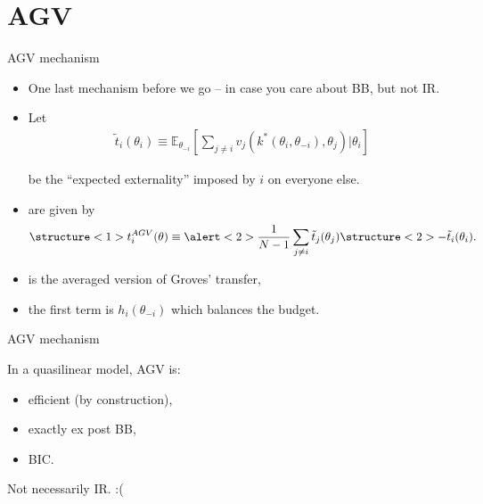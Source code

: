 \documentclass[english,10pt
,aspectratio=169
]{beamer}
\begin{document}
\section{AGV}

\begin{frame}{AGV mechanism}
\begin{itemize}
	\item One last mechanism before we go -- in case you care about BB, but not IR.
	\item Let 
	\vspace{-0.5em}\begin{align*}
		\tilde{t}_i (\theta_i) \equiv \mathbb{E}_{\theta_{-i}} \left[ \sum_{j \neq i} v_j (k^*(\theta_i,\theta_{-i}), \theta_j) | \theta_i \right]
	\end{align*}
	
	be the ``expected externality'' imposed by $i$ on everyone else.
	\item {} are given by
	\vspace{-0.5em}\begin{align*}
		\structure<1>{t_i^{AGV} (\theta) \equiv \alert<2>{\frac{1}{N-1} \sum_{j \neq i} \tilde{t}_j (\theta_j)} \structure<2>{- \tilde{t}_i (\theta_i)}}.
	\end{align*}\vspace{-1em}
	\pause
	\item {} is the averaged version of Groves' transfer,
	\item \alert{the first term} is $h_i(\theta_{-i})$ which balances the budget.
\end{itemize}
\end{frame}


\begin{frame}{AGV mechanism}
\begin{theorem}[AGV]
	In a \alert{quasilinear} model, AGV is:
	\begin{itemize}
		\item efficient (by construction),
		\item exactly ex post BB,
		\item BIC.
	\end{itemize}
\end{theorem}
Not necessarily IR. :(
\end{frame}
\end{document}
